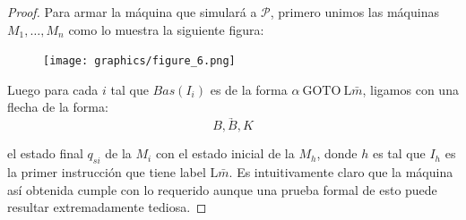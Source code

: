 \begin{proof}
    \PN Para armar la máquina que simulará a $\mathcal{P}$, primero unimos las máquinas $M_{1}, \dotsc, M_{n}$ como lo
    muestra la siguiente figura:

    \begin{figure}[h]
      \centering
      \texttt{[image: graphics/figure\_6.png]}
    \end{figure}

    \pagebreak
    \PN Luego para cada $i$ tal que $Bas(I_{i})$ es de la forma $\alpha \ \mathrm{GOTO} \ \mathrm{L}\bar{m}$, ligamos
    con una flecha de la forma:
		\[
      \underrightarrow{\qquad B,B,K \qquad}
		\]

    \vspace{5mm}
    \PN el estado final $q_{si}$ de la $M_{i}$ con el estado inicial de la $M_{h}$, donde $h$ es tal que $I_{h}$ es la
    primer instrucción que tiene label $\mathrm{L}\bar{m}$. Es intuitivamente claro que la máquina así obtenida cumple
    con lo requerido aunque una prueba formal de esto puede resultar extremadamente tediosa.
	\end{proof}


